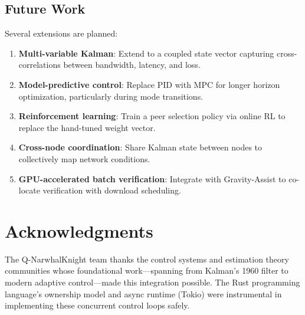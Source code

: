 \documentclass[11pt,a4paper]{article}
\begin{document}
\subsection{Future Work}

Several extensions are planned:
\begin{enumerate}
    \item \textbf{Multi-variable Kalman}: Extend to a coupled state vector capturing cross-correlations between bandwidth, latency, and loss.
    \item \textbf{Model-predictive control}: Replace PID with MPC for longer horizon optimization, particularly during mode transitions.
    \item \textbf{Reinforcement learning}: Train a peer selection policy via online RL to replace the hand-tuned weight vector.
    \item \textbf{Cross-node coordination}: Share Kalman state between nodes to collectively map network conditions.
    \item \textbf{GPU-accelerated batch verification}: Integrate with Gravity-Assist to co-locate verification with download scheduling.
\end{enumerate}

\section*{Acknowledgments}

The Q-NarwhalKnight team thanks the control systems and estimation theory communities whose foundational work---spanning from Kalman's 1960 filter to modern adaptive control---made this integration possible. The Rust programming language's ownership model and async runtime (Tokio) were instrumental in implementing these concurrent control loops safely.
\end{document}
